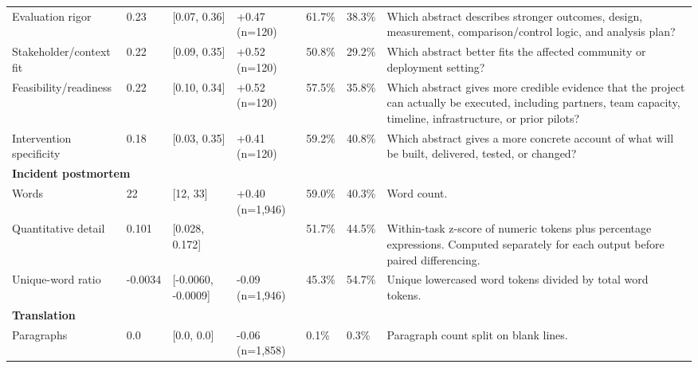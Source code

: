 \begin{longtable}{lllllll}
Evaluation rigor & 0.23 & [0.07, 0.36] & +0.47 (n=120) & 61.7\% & 38.3\% & Which abstract describes stronger outcomes, design, measurement, comparison/control logic, and analysis plan? \\
Stakeholder/context fit & 0.22 & [0.09, 0.35] & +0.52 (n=120) & 50.8\% & 29.2\% & Which abstract better fits the affected community or deployment setting? \\
Feasibility/readiness & 0.22 & [0.10, 0.34] & +0.52 (n=120) & 57.5\% & 35.8\% & Which abstract gives more credible evidence that the project can actually be executed, including partners, team capacity, timeline, infrastructure, or prior pilots? \\
Intervention specificity & 0.18 & [0.03, 0.35] & +0.41 (n=120) & 59.2\% & 40.8\% & Which abstract gives a more concrete account of what will be built, delivered, tested, or changed? \\
\multicolumn{7}{l}{\textbf{Incident postmortem}} \\
Words & 22 & [12, 33] & +0.40 (n=1,946) & 59.0\% & 40.3\% & Word count. \\
Quantitative detail & 0.101 & [0.028, 0.172] &  & 51.7\% & 44.5\% & Within-task z-score of numeric tokens plus percentage expressions. Computed separately for each output before paired differencing. \\
Unique-word ratio & -0.0034 & [-0.0060, -0.0009] & -0.09 (n=1,946) & 45.3\% & 54.7\% & Unique lowercased word tokens divided by total word tokens. \\
\multicolumn{7}{l}{\textbf{Translation}} \\
Paragraphs & 0.0 & [0.0, 0.0] & -0.06 (n=1,858) & 0.1\% & 0.3\% & Paragraph count split on blank lines. \\
\end{longtable}
